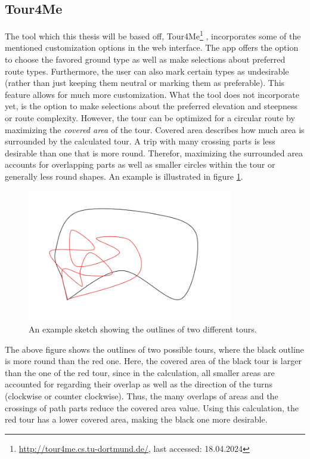 \subsection{Tour4Me}
\label{subsec:Tour4Me}

The tool which this thesis will be based off, Tour4Me\footnote{\url{http://tour4me.cs.tu-dortmund.de/}, last accessed: 18.04.2024} \cite{buchin_tour4me_2022}, incorporates some of the mentioned customization options in the web interface. 
The app offers the option to choose the favored ground type as well as make selections about preferred route types.
Furthermore, the user can also mark certain types as undesirable (rather than just keeping them neutral or marking them as preferable).
This feature allows for much more customization.
What the tool does not incorporate yet, is the option to make selections about the preferred elevation and steepness or route complexity.
However, the tour can be optimized for a circular route by maximizing the \textit{covered area} of the tour.
Covered area describes how much area is surrounded by the calculated tour. 
A trip with many crossing parts is less desirable than one that is more round.
Therefor, maximizing the surrounded area accounts for overlapping parts as well as smaller circles within the tour or generally less round shapes.
An example is illustrated in figure \ref{fig:coveredAreaSketch}. 

\begin{figure}[H]
	\begin{centering}
		\includegraphics[width=0.8\textwidth]{bilder/CoveredAreaSketch.png}
		\caption{An example sketch showing the outlines of two different tours.}
		\label{fig:coveredAreaSketch}
	\end{centering}
\end{figure}

The above figure shows the outlines of two possible tours, where the black outline is more round than the red one. 
Here, the covered area of the black tour is larger than the one of the red tour, since in the calculation, all smaller areas are accounted for regarding their overlap as well as the direction of the turns (clockwise or counter clockwise).
Thus, the many overlaps of areas and the crossings of path parts reduce the covered area value.
Using this calculation, the red tour has a lower covered area, making the black one more desirable.



